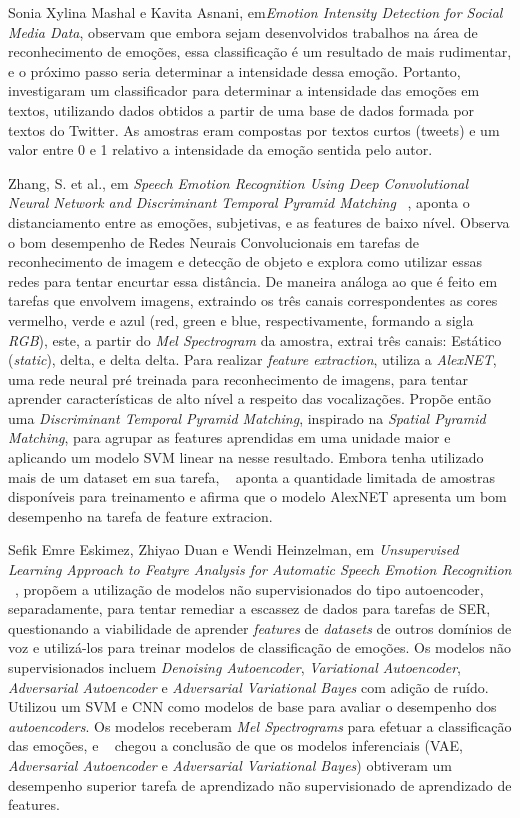Sonia Xylina Mashal e Kavita Asnani, em\textit{Emotion Intensity Detection for Social Media Data}\cite{14}, observam que embora sejam desenvolvidos trabalhos na área de reconhecimento de emoções, essa classificação é um resultado de mais rudimentar, e o próximo passo seria determinar a intensidade dessa emoção. Portanto, investigaram um classificador para determinar a intensidade das emoções em textos, utilizando dados obtidos a partir de uma base de dados formada por textos do Twitter. As amostras eram compostas por textos curtos (tweets) e um valor entre 0 e 1 relativo a intensidade da emoção sentida pelo autor.

Zhang, S. et al., em \textit{Speech Emotion Recognition Using Deep Convolutional Neural Network and Discriminant Temporal Pyramid Matching} ~\cite{32.25}, aponta o distanciamento entre as emoções, subjetivas, e as features de baixo nível. Observa o bom desempenho de Redes Neurais Convolucionais em tarefas de reconhecimento de imagem e detecção de objeto e explora como utilizar essas redes para tentar encurtar essa distância. De maneira análoga ao que é feito em tarefas que envolvem imagens, extraindo os três canais correspondentes as cores vermelho, verde e azul (red, green e blue, respectivamente, formando a sigla \textit{RGB}), este, a partir do \textit{Mel Spectrogram} da amostra, extrai três canais: Estático (\textit{static}), delta, e delta delta. Para realizar \textit{feature extraction}, utiliza a \textit{AlexNET}, uma rede neural pré treinada para reconhecimento de imagens, para tentar aprender características de alto nível a respeito das vocalizações. Propõe então uma \textit{Discriminant Temporal Pyramid Matching}, inspirado na \textit{Spatial Pyramid Matching}, para agrupar as features aprendidas em uma unidade maior e aplicando um modelo \acrshort{SVM} linear na nesse resultado. Embora tenha utilizado mais de um dataset em sua tarefa, ~\cite{32.25} aponta a quantidade limitada de amostras disponíveis para treinamento e afirma que o modelo AlexNET apresenta um bom desempenho na tarefa de feature extracion.

Sefik Emre Eskimez, Zhiyao Duan e Wendi Heinzelman, em \textit{Unsupervised Learning Approach to Featyre Analysis for Automatic Speech Emotion Recognition} ~\cite{34}, propõem a utilização de modelos não supervisionados do tipo autoencoder, separadamente, para tentar remediar a escassez de dados para tarefas de \acrshort{SER}, questionando a viabilidade de aprender \textit{features} de \textit{datasets} de outros domínios de voz e utilizá-los para treinar modelos de classificação de emoções. Os modelos não supervisionados incluem\textit{ Denoising Autoencoder}, \textit{Variational Autoencoder}, \textit{Adversarial Autoencoder} e \textit{Adversarial Variational Bayes} com adição de ruído. Utilizou um \acrshort{SVM} e \acrshort{CNN} como modelos de base para avaliar o desempenho dos \textit{autoencoders}. Os modelos receberam \textit{Mel Spectrograms} para efetuar a classificação das emoções, e ~\cite{34} chegou a conclusão de que os modelos inferenciais (\acrshort{VAE}, \textit{Adversarial Autoencoder} e \textit{Adversarial Variational Bayes}) obtiveram um desempenho superior tarefa de aprendizado não supervisionado de aprendizado de features.

